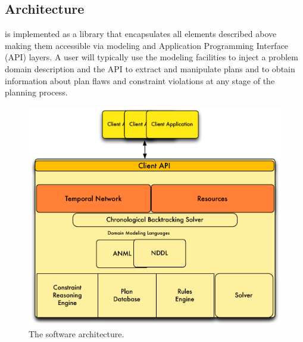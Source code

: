 \subsection{Architecture}
\label{sec:europa:arch}


\eu is implemented as a library that encapsulates all elements
described above making them accessible via modeling and Application
Programming Interface (API) layers.  A user will typically use the
modeling facilities to inject a problem domain description and the
API to extract and manipulate plans and to obtain information about
plan flaws and constraint violations at any stage of the planning
process.

\begin{figure}[b]
\centering
\includegraphics[scale=0.5]{figs/EUROPA-Architecture.pdf}
\caption{\small The \eu software architecture.}
\label{fig:europa-architecture}
\end{figure}

